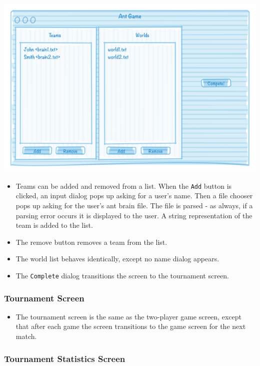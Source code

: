\documentclass[11pt]{article}
\begin{document}
\begin{center}
\includegraphics[width=\textwidth]{low-level-diagrams/interface/tournament-setup-screen}
\end{center}

\begin{itemize}
\item Teams can be added and removed from a list. When the \texttt{Add} button is clicked, an input dialog pops up asking for a user's name. Then a file chooser pops up asking for the user's ant brain file. The file is parsed - as always, if a parsing error occurs it is displayed to the user. A string representation of the team is added to the list.
\item The remove button removes a team from the list.
\item The world list behaves identically, except no name dialog appears.
\item The \texttt{Complete} dialog transitions the screen to the tournament screen.
\end{itemize}

\subsubsection{Tournament Screen}

\begin{itemize}
\item The tournament screen is the same as the two-player game screen, except that after each game the screen transitions to the game screen for the next match.
\end{itemize}

\subsubsection{Tournament Statistics Screen}
\end{document}
